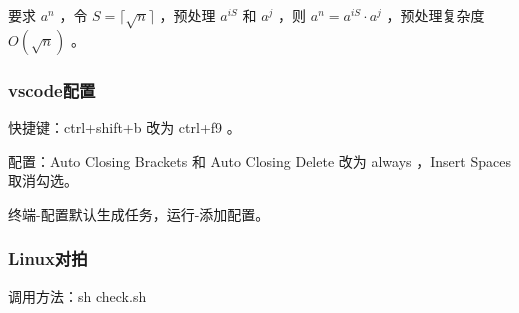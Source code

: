 要求 $a^{n}$ ，令 $S=\lceil \sqrt n\rceil$ ，预处理 $a^{iS}$ 和 $a^{j}$ ，则 $a^n=a^{iS}\cdot a^j$ ，预处理复杂度 $O(\sqrt n)$ 。

\vspace{-0.3cm}

\subsubsection{vscode配置}

快捷键：ctrl+shift+b 改为 ctrl+f9 。

配置：Auto Closing Brackets 和 Auto Closing Delete 改为 always ，Insert Spaces 取消勾选。

终端-配置默认生成任务，运行-添加配置。

\vspace{-0.3cm}

\subsubsection{Linux对拍}

调用方法：sh check.sh



